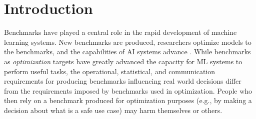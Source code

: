 \documentclass{article}
\begin{document}
% 




\section{Introduction}
Benchmarks have played a central role in the rapid development of machine learning systems. New benchmarks are produced, researchers optimize models to the benchmarks, and the capabilities of AI systems advance \cite{deng2009,srivastava2022}. While benchmarks as \textit{optimization} targets have greatly advanced the capacity for ML systems to perform useful tasks, the operational, statistical, and communication requirements for producing benchmarks influencing real world decisions differ from the requirements imposed by benchmarks used in optimization. People who then rely on a benchmark produced for optimization purposes (e.g., by making a decision about what is a safe use case) may harm themselves or others.
\end{document}
